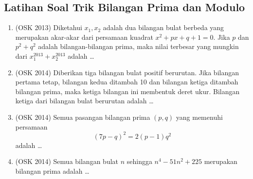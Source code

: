 \subsection{Latihan Soal Trik Bilangan Prima dan Modulo}
\begin{enumerate}
        \item (OSK 2013) Diketahui $x_1,x_2$ adalah dua bilangan bulat berbeda yang merupakan akar-akar dari persamaan kuadrat $x^2+px+q+1=0$. Jika $p$ dan $p^2+q^2$ adalah bilangan-bilangan prima, maka nilai terbesar yang mungkin dari $x_1^{2013}+x_2^{2013}$ adalah \dots
        
        \item (OSK 2014) Diberikan tiga bilangan bulat positif berurutan. Jika bilangan pertama tetap, bilangan kedua ditambah 10 dan bilangan ketiga ditambah bilangan prima, maka ketiga bilangan ini membentuk deret ukur. Bilangan ketiga dari bilangan bulat berurutan adalah \dots
        
        \item (OSK 2014) Semua pasangan bilangan prima $(p,q)$ yang memenuhi persamaan
        $$(7p-q)^2=2(p-1)q^2$$
        adalah \dots
        
        \item (OSK 2014) Semua bilangan bulat $n$ sehingga $n^4-51n^2+225$ merupakan bilangan prima adalah \dots
\end{enumerate}